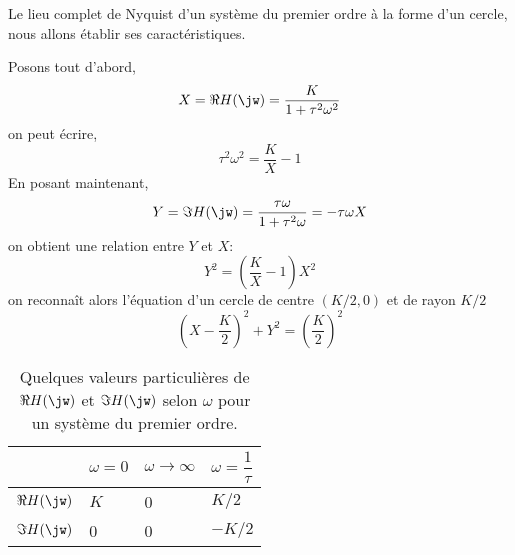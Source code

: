 Le lieu complet de Nyquist d'un système du premier ordre à la forme d'un 
cercle, nous allons établir ses caractéristiques\cite{9782729860127}.

Posons tout d'abord, 
$$
X=\Re{H(\jw)}=\dfrac{K}{1+\tau^2\omega^2}
$$
on peut écrire,
$$
\tau^2\omega^2=\dfrac{K}{X}-1
$$
En posant maintenant, 
$$
Y=\Im{H(\jw)}=\dfrac{\tau\omega}{1+\tau^2\omega}=-\tau\omega X
$$
on obtient une relation entre $Y$ et $X$:
$$
Y^2=\left(\dfrac{K}{X}-1\right)X^2
$$
on reconnaît alors l'équation d'un cercle de centre $(K/2,0)$ et 
de rayon $K/2$
$$
\left(X-\dfrac{K}{2}\right)^2+Y^2=\left(\dfrac{K}{2}\right)^2
$$
\begin{table}
    \centering
    \begin{tabular}{P{2.0cm}P{2.0cm}P{2.0cm}P{2.0cm}}
        \toprule
        & $\omega=0$  & $\omega\to\infty$ & $\omega=\dfrac{1}{\tau}$ \\[0em]
        \midrule
        $\Re{H(\jw)}$ & $K$               & 0               & $K/2$  \\[0em]
        \midrule
        $\Im{H(\jw)}$ & 0                 & 0               & $-K/2$ \\[0em]
        \bottomrule
    \end{tabular}
    \caption{Quelques valeurs particulières de $\Re{H(\jw)}$ et $\Im{H(\jw)}$
    selon $\omega$ pour un système du premier ordre\label{tab-nyquist-vp_1er}.}
\end{table}

